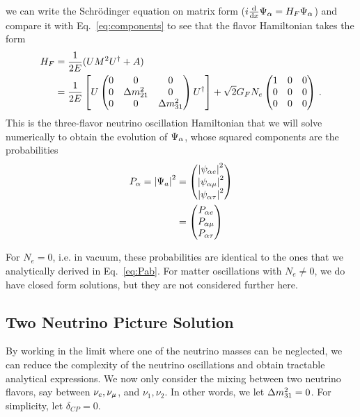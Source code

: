 we can write the Schrödinger equation on matrix form ($i \dv{}{x}\Psi_\alpha = H_F \Psi_\alpha$) and compare it with Eq.~\ref{eq:components} to see that the flavor Hamiltonian takes the form 
\begin{align}\label{eq:H_3gen}
    H_F &= \frac{1}{2E}(U M^2 U^\dagger + A) \nonumber \\
        &= \frac{1}{2E}\left[U \begin{pmatrix}
            0 & 0 & 0 \\
            0 & \dm_{21} & 0 \\
            0 & 0 & \dm_{31}
        \end{pmatrix} U^\dagger\right] + \sqrt{2}G_F N_e \begin{pmatrix}
            1 & 0 & 0 \\
            0 & 0 & 0 \\
            0 & 0 & 0
        \end{pmatrix}\,. 
\end{align}
This is the three-flavor neutrino oscillation Hamiltonian that we will solve numerically to obtain the evolution of $\Psi_\alpha$, whose squared components
are the probabilities
\begin{align}
    P_\alpha = \abs{\Psi_a}^2 &=\begin{pmatrix}
        \abs{\psi_{\alpha e}}^2 \\
        \abs{\psi_{\alpha \mu}}^{2} \\
        \abs{\psi_{\alpha \tau}}^{2}
    \end{pmatrix} \nonumber \\
    &=\begin{pmatrix}
        P_{\alpha e} \\
        P_{\alpha \mu} \\
        P_{\alpha \tau}
    \end{pmatrix} 
\end{align}

For $N_e = 0$, i.e. in vacuum, these probabilities are identical to the ones that we analytically derived in Eq.~\ref{eq:Pab}.
For matter oscillations with $N_e \neq 0$, we do have closed form solutions, but they are not considered further here. 


\subsection{Two Neutrino Picture Solution}
By working in the limit where one of the neutrino masses can be neglected, 
we can reduce the complexity of the neutrino oscillations and obtain tractable analytical 
expressions. 
We now only consider the mixing between two neutrino flavors, say between $\nu_e, \nu_\mu$, and $\nu_1, \nu_2$. In other words, we let $\dm[31] = 0$. For simplicity, let $\delta_{CP} = 0$.

